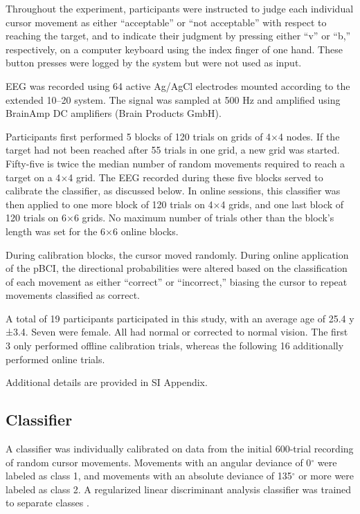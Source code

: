 Throughout the experiment, participants were instructed to judge each individual cursor movement as either ``acceptable'' or ``not acceptable'' with respect to reaching the target, and to indicate their judgment by pressing either ``v'' or ``b,'' respectively, on a computer keyboard using the index finger of one hand. These button presses were logged by the system but were not used as input.

EEG was recorded using 64 active Ag/AgCl electrodes mounted according to the extended 10–20 system. The signal was sampled at 500 Hz and amplified using BrainAmp DC amplifiers (Brain Products GmbH).

Participants first performed 5 blocks of 120 trials on grids of 4$\times$4 nodes. If the target had not been reached after 55 trials in one grid, a new grid was started. Fifty-five is twice the median number of random movements required to reach a target on a 4$\times$4 grid. The EEG recorded during these five blocks served to calibrate the classifier, as discussed below. In online sessions, this classifier was then applied to one more block of 120 trials on 4$\times$4 grids, and one last block of 120 trials on 6$\times$6 grids. No maximum number of trials other than the block's length was set for the 6$\times$6 online blocks.

During calibration blocks, the cursor moved randomly. During online application of the pBCI, the directional probabilities were altered based on the classification of each movement as either ``correct'' or ``incorrect,'' biasing the cursor to repeat movements classified as correct.

A total of 19 participants participated in this study, with an average age of 25.4 y ±3.4. Seven were female. All had normal or corrected to normal vision. The first 3 only performed offline calibration trials, whereas the following 16 additionally performed online trials.

Additional details are provided in SI Appendix.


\subsection{Classifier}

A classifier was individually calibrated on data from the initial 600-trial recording of random cursor movements. Movements with an angular deviance of 0$^{\circ}$ were labeled as class 1, and movements with an absolute deviance of 135$^{\circ}$ or more were labeled as class 2. A regularized linear discriminant analysis classifier was trained to separate classes \cite{blankertz2011}.

